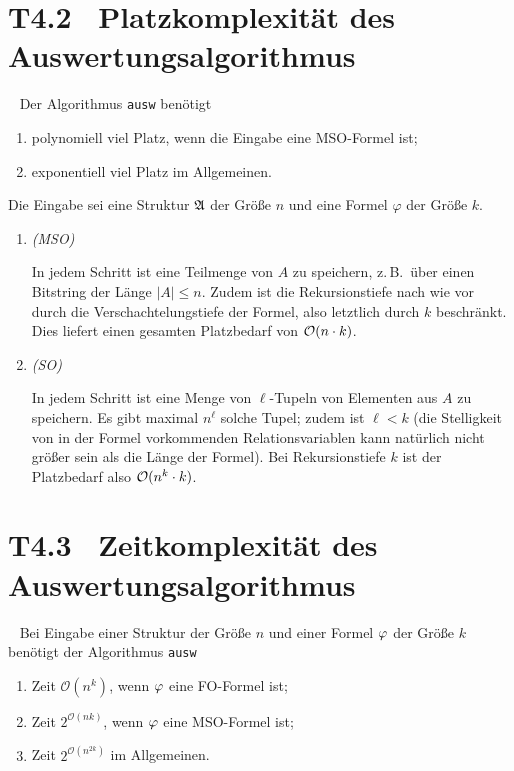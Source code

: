 \documentclass[fontsize=11pt, twoside=false, numbers=autoenddot]{scrbook}
\begin{document}
\section*{T4.2~ Platzkomplexität des Auswertungsalgorithmus}

~
Der Algorithmus \texttt{ausw} benötigt
\begin{enumerate}
  \item
    polynomiell viel Platz, wenn die Eingabe eine MSO-Formel ist;
  \item
    exponentiell viel Platz im Allgemeinen.
\end{enumerate}

\begin{beweis}
  Die Eingabe sei eine Struktur $\mathfrak{A}$ der Größe $n$
  und eine Formel $\varphi$ der Größe $k$.
  \begin{enumerate}
    \item
      \emph{(MSO)}
      \par
      In jedem Schritt ist eine Teilmenge von $A$ zu speichern,
      z.\,B.\ über einen Bitstring der Länge $|A| \leq n$.
      Zudem ist die Rekursionstiefe nach wie vor durch die Verschachtelungstiefe der Formel,
      also letztlich durch $k$ beschränkt.
      Dies liefert einen gesamten Platzbedarf von $\mathcal{O}(n\cdot k)$.
    \item
      \emph{(SO)}
      \par
      In jedem Schritt ist eine Menge von $\ell$-Tupeln von Elementen aus $A$ zu speichern.
      Es gibt maximal $n^\ell$ solche Tupel; zudem ist $\ell < k$
      (die Stelligkeit von in der Formel vorkommenden Relationsvariablen
      kann natürlich nicht größer sein als die Länge der Formel).
      Bei Rekursionstiefe $k$ ist der Platzbedarf also $\mathcal{O}(n^k \cdot k)$.
      \qedhere
  \end{enumerate}
\end{beweis}

\section*{T4.3~ Zeitkomplexität des Auswertungsalgorithmus}

~
\noindent
Bei Eingabe einer Struktur \Amf der Gr\"o{\ss}e $n$ und einer Formel $\varphi$
der Gr{\"o}{\ss}e $k$ ben\"otigt der Algorithmus \texttt{ausw}
%
\begin{enumerate}
  \item
    Zeit $\mathcal{O}(n^k)$, wenn $\varphi$ eine FO-Formel ist;
  \item
    Zeit $2^{\mathcal{O}(nk)}$, wenn $\varphi$ eine MSO-Formel ist;
  \item
    Zeit $2^{\mathcal{O}(n^{2k})}$ im Allgemeinen.
\end{enumerate}
\end{document}
